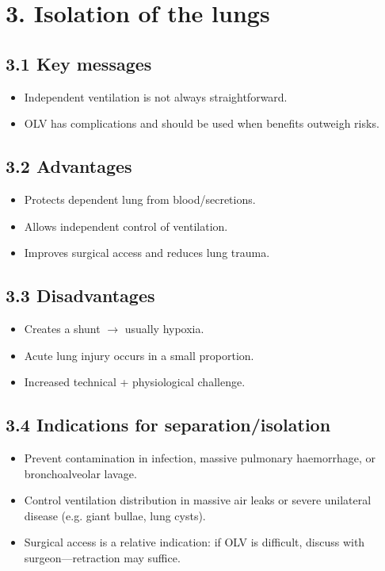 \documentclass[11pt,a4paper]{article}
\begin{document}
\section{3. Isolation of the lungs}

\subsection{3.1 Key messages}
\begin{itemize}[leftmargin=*, itemsep=2pt]
  \item Independent ventilation is not always straightforward.
  \item OLV has complications and should be used when benefits outweigh risks.
\end{itemize}

\subsection{3.2 Advantages}
\begin{itemize}[leftmargin=*, itemsep=2pt]
  \item Protects dependent lung from blood/secretions.
  \item Allows independent control of ventilation.
  \item Improves surgical access and reduces lung trauma.
\end{itemize}

\subsection{3.3 Disadvantages}
\begin{itemize}[leftmargin=*, itemsep=2pt]
  \item Creates a shunt \(\rightarrow\) usually hypoxia.
  \item Acute lung injury occurs in a small proportion.
  \item Increased technical + physiological challenge.
\end{itemize}

\subsection{3.4 Indications for separation/isolation}
\begin{itemize}[leftmargin=*, itemsep=2pt]
  \item Prevent contamination in infection, massive pulmonary haemorrhage, or bronchoalveolar lavage.
  \item Control ventilation distribution in massive air leaks or severe unilateral disease (e.g. giant bullae, lung cysts).
  \item Surgical access is a relative indication: if OLV is difficult, discuss with surgeon---retraction may suffice.
\end{itemize}
\end{document}
